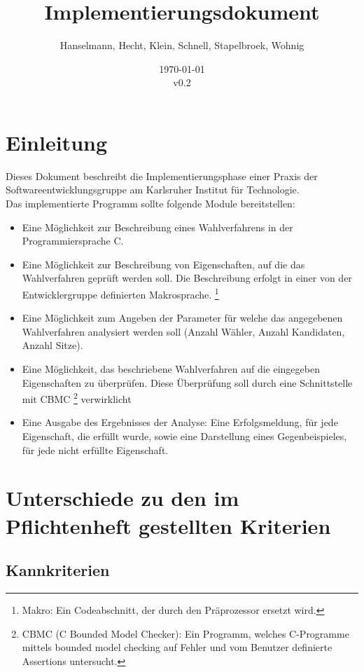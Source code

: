 \documentclass[a4paper]{scrreprt}
\begin{document}
\title{Implementierungsdokument}
\author{Hanselmann, Hecht, Klein, Schnell, Stapelbroek, Wohnig}
\date{\today\\v0.2}
\maketitle 
\tableofcontents	
\listoffigures


\chapter{Einleitung}
Dieses Dokument beschreibt die Implementierungsphase einer Praxis der Softwareentwicklungsgruppe am Karlsruher Institut für Technologie. \\
Das implementierte Programm sollte folgende Module bereitstellen: 
\begin{itemize}
\item Eine Möglichkeit zur Beschreibung eines Wahlverfahrens in der Programmiersprache C. 
\item Eine Möglichkeit zur Beschreibung von Eigenschaften, auf die das Wahlverfahren geprüft werden soll. Die Beschreibung erfolgt in einer von der Entwicklergruppe definierten Makrosprache. \footnote{Makro: Ein Codeabschnitt, der durch den Präprozessor ersetzt wird.}
\item Eine Möglichkeit zum Angeben der Parameter für welche das angegebenen Wahlverfahren analysiert werden soll (Anzahl Wähler, Anzahl Kandidaten, Anzahl Sitze). 
\item Eine Möglichkeit, das beschriebene Wahlverfahren auf die eingegeben Eigenschaften zu überprüfen. Diese Überprüfung soll durch eine Schnittstelle mit CBMC \footnote{CBMC (C Bounded Model Checker): Ein Programm, welches C-Programme mittels bounded model checking auf Fehler und vom Benutzer definierte Assertions untersucht. } verwirklicht
\item Eine Ausgabe des Ergebnisses der Analyse: Eine Erfolgsmeldung, für jede Eigenschaft, die erfüllt wurde, sowie eine Darstellung eines Gegenbeispieles, für jede nicht erfüllte Eigenschaft. 
\end{itemize}


\chapter{Unterschiede zu den im Pflichtenheft gestellten Kriterien}

\section{Kannkriterien}
\end{document}
